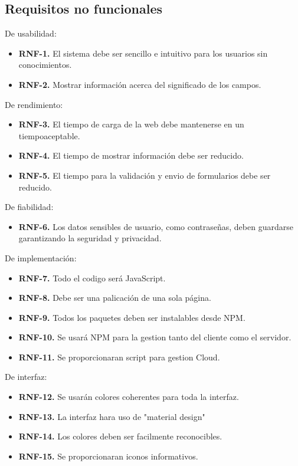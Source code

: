 \subsection{Requisitos no funcionales}

  De usabilidad:
\begin{itemize}
  \item \textbf{RNF-1.} El sistema debe ser sencillo e intuitivo para los usuarios sin conocimientos. 
  \item \textbf{RNF-2.} Mostrar información acerca del significado de los campos.
\end{itemize}
 De rendimiento:
\begin{itemize}
  \item \textbf{RNF-3.} El tiempo de carga de la web debe mantenerse en un tiempoaceptable.
  \item \textbf{RNF-4.} El tiempo de mostrar información debe ser reducido.
  \item \textbf{RNF-5.} El tiempo para la validación y envio de formularios debe ser reducido.
\end{itemize}
 De fiabilidad:
\begin{itemize}
  \item \textbf{RNF-6.} Los datos sensibles de usuario, como contraseñas, deben guardarse garantizando la seguridad y privacidad.
\end{itemize}
 De implementación: 
\begin{itemize}
  \item \textbf{RNF-7.} Todo el codigo será JavaScript.
  \item \textbf{RNF-8.} Debe ser una palicación de una sola página.
  \item \textbf{RNF-9.} Todos los paquetes deben ser instalables desde NPM.
  \item \textbf{RNF-10.} Se usará NPM para la gestion tanto del cliente como el servidor.
  \item \textbf{RNF-11.} Se proporcionaran script para gestion Cloud.
\end{itemize}
De interfaz:
\begin{itemize}
  \item \textbf{RNF-12.} Se usarán colores coherentes para toda la interfaz.
  \item \textbf{RNF-13.} La interfaz hara uso de "material design"
  \item \textbf{RNF-14.} Los colores deben ser facilmente reconocibles.
  \item \textbf{RNF-15.} Se proporcionaran iconos informativos.
\end{itemize}

